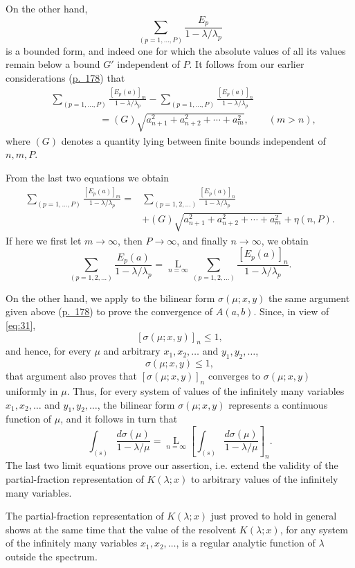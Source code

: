 \documentclass[b5paper,twoside]{article}
\newcommand{\originalpage}[1]{\phantomsection\label{origpage:#1}}
\begin{document}
On the other hand,
\[
  \sum_{(p=1,\ldots,P)}\frac{E_p}{1-\lambda/\lambda_p}
\]
is a bounded form, and indeed one for which the absolute values of all its
values remain below a bound $G'$ independent of $P$.  It follows from our
earlier considerations\originalpage{188}
(\hyperref[origpage:178]{p.~178}) that
\[
\begin{aligned}
  &\sum_{(p=1,\ldots,P)}
    \frac{[E_p(a)]_m}{1-\lambda/\lambda_p}
  -\sum_{(p=1,\ldots,P)}
    \frac{[E_p(a)]_n}{1-\lambda/\lambda_p}\\
  &\hspace{5em}
    =(G)\sqrt{a_{n+1}^2+a_{n+2}^2+\cdots+a_m^2},
    \qquad(m>n),
\end{aligned}
\]
where $(G)$ denotes a quantity lying between finite bounds independent of
$n,m,P$.

From the last two equations we obtain
\[
\begin{aligned}
  \sum_{(p=1,\ldots,P)}
    \frac{[E_p(a)]_m}{1-\lambda/\lambda_p}
  ={}&\sum_{(p=1,2,\ldots)}
    \frac{[E_p(a)]_n}{1-\lambda/\lambda_p}\\
  &+(G)\sqrt{a_{n+1}^2+a_{n+2}^2+\cdots+a_m^2}
    +\eta(n,P).
\end{aligned}
\]
If here we first let $m\to\infty$, then $P\to\infty$, and finally
$n\to\infty$, we obtain
\[
  \sum_{(p=1,2,\ldots)}\frac{E_p(a)}{1-\lambda/\lambda_p}
  =\mathop{\mathrm{L}}\limits_{n=\infty}
   \sum_{(p=1,2,\ldots)}
   \frac{[E_p(a)]_n}{1-\lambda/\lambda_p}.
\]

On the other hand, we apply to the bilinear form $\sigma(\mu;x,y)$ the same
argument given above (\hyperref[origpage:178]{p.~178}) to prove the
convergence of $A(a,b)$.  Since, in view of \eqref{eq:31},
\[
  [\sigma(\mu;x,y)]_n\le1,
\]
and hence, for every $\mu$ and arbitrary $x_1,x_2,\ldots$ and
$y_1,y_2,\ldots$,
\[
  \sigma(\mu;x,y)\le1,
\]
that argument also proves that $[\sigma(\mu;x,y)]_n$ converges to
$\sigma(\mu;x,y)$ uniformly in $\mu$.  Thus, for every
system of values of the infinitely many variables $x_1,x_2,\ldots$ and
$y_1,y_2,\ldots$, the bilinear form $\sigma(\mu;x,y)$ represents a continuous
function of $\mu$, and it follows in turn that
\[
  \int_{(s)}\frac{d\sigma(\mu)}{1-\lambda/\mu}
  =\mathop{\mathrm{L}}\limits_{n=\infty}
   \left[\int_{(s)}\frac{d\sigma(\mu)}{1-\lambda/\mu}\right]_n.
\]
The last two limit equations prove our assertion, i.e. extend the validity of
the partial-fraction representation of $K(\lambda;x)$ to arbitrary values of
the infinitely many variables.

The partial-fraction representation of $K(\lambda;x)$ just proved to hold in
general shows at the same time that the value of the resolvent
\originalpage{189}$K(\lambda;x)$, for any system of the infinitely
many variables $x_1,x_2,\ldots$, is a regular analytic function of $\lambda$
outside the spectrum.
\end{document}
